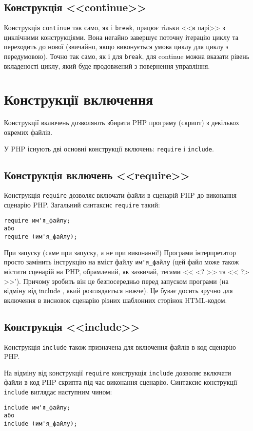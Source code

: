 \subsection*{Конструкція <<continue>>}
Конструкція \verb'continue' так само, як і \verb'break', працює тільки <<в парі>> з циклічними конструкціями. Вона негайно завершує поточну ітерацію циклу та переходить до нової (звичайно, якщо виконується умова циклу для циклу з передумовою). Точно так само, як і для \verb'break', для continue можна вказати рівень вкладеності циклу, який буде продовжений з повернення управління.


\pagebreak[3]

\section{Конструкції включення}
\nopagebreak[4]
Конструкції включень дозволяють збирати PHP програму (скрипт) з декількох окремих файлів.

У PHP існують дві основні конструкції включень: \verb'require' і \verb'include'.
\subsection*{Конструкція включень <<require>>}
Конструкція \verb'require' дозволяє включати файли в сценарій PHP до виконання сценарію PHP. Загальний синтаксис \verb'require' такий:
\begin{verbatim}
require им'я_файлу;
або
require (им'я_файлу);
\end{verbatim}
При запуску (саме при запуску, а не при виконанні!) Програми інтерпретатор просто замінить інструкцію на вміст файлу \verb|им'я_файлу| (цей файл може також містити сценарій на PHP, обрамлений, як зазвичай, тегами << <? >> та << ?> >>'). Причому зробить він це безпосередньо перед запуском програми (на відміну від include , який розглядається нижче). Це буває досить зручно для включення в висновок сценарію різних шаблонних сторінок HTML-кодом. 
\subsection*{Конструкція <<include>>}
Конструкція \verb'include' також призначена для включення файлів в код сценарію PHP.

На відміну від конструкції \verb'require' конструкція \verb'include' дозволяє включати файли в код PHP скрипта під час виконання сценарію. Синтаксис конструкції \verb'include' виглядає наступним чином:
\begin{verbatim}
include им'я_файлу;
або
include (им'я_файлу);
\end{verbatim}

